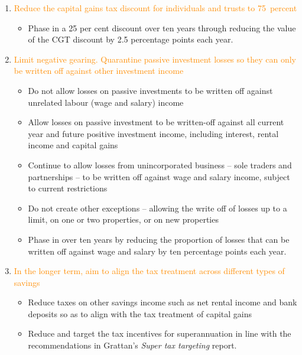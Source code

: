 \documentclass{grattan}\usepackage[]{graphicx}\usepackage[]{color}
\begin{document}
\begin{recommendations}[-35pt]

\RaggedRight
\begin{enumerate}
\item \textcolor{DarkOrange}{Reduce the capital gains tax discount for individuals and trusts to 75~percent} 
\begin{itemize}
  \item Phase in a 25 per cent discount over ten years through reducing the value of the CGT discount by 2.5 percentage points each year.
\end{itemize}
\item \textcolor{DarkOrange}{Limit negative gearing. Quarantine passive investment losses so they can only be written off against other investment income}
\begin{itemize}
  \item 	Do not allow losses on passive investments to be written off against unrelated labour (wage and salary) income 
\item 	Allow losses on passive investment to be written-off against all current year and future positive investment income, including interest, rental income and capital gains 
\item 	Continue to allow losses from unincorporated business -- sole traders and partnerships -- to be written off against wage and salary income, subject to current restrictions
\item 	Do not create other exceptions -- allowing the write off of losses up to a limit, on one or two properties, or on new properties
\item 	Phase in over ten years by reducing the proportion of losses that can be written off against wage and salary by ten percentage points each year.
\end{itemize}

\item \textcolor{DarkOrange}{In the longer term, aim to align the tax treatment across different types of savings}
\begin{itemize}
\item	Reduce taxes on other savings income such as net rental income and bank deposits so as to align with the tax treatment of capital gains
\item	Reduce and target the tax incentives for superannuation in line with the recommendations in Grattan's \textit{Super tax targeting} report. 
\end{itemize}
\end{enumerate}

\end{recommendations}
\renewcommand{\labelitemi}{\color{Orange}\parbox[c]{.5em}{\ensuremath{\bullet}}}
\renewcommand{\labelenumi}{\color{Orange}{\bfseries \arabic{enumi}.~}}
\setcounter{tocdepth}{1}
\contentspage
\end{document}
